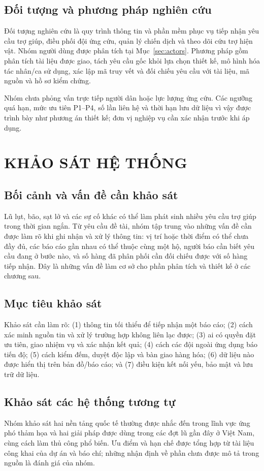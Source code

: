 \documentclass[12pt,a4paper,oneside]{report}
\begin{document}
\section{Đối tượng và phương pháp nghiên cứu}
Đối tượng nghiên cứu là quy trình thông tin và phần mềm phục vụ tiếp nhận yêu cầu trợ giúp, điều phối đội ứng cứu, quản lý chiến dịch và theo dõi cứu trợ hiện vật. Nhóm người dùng được phân tích tại Mục~\ref{sec:actors}. Phương pháp gồm phân tích tài liệu được giao, tách yêu cầu gốc khỏi lựa chọn thiết kế, mô hình hóa tác nhân/ca sử dụng, xác lập mã truy vết và đối chiếu yêu cầu với tài liệu, mã nguồn và hồ sơ kiểm chứng.

Nhóm chưa phỏng vấn trực tiếp người dân hoặc lực lượng ứng cứu. Các ngưỡng quá hạn, mức ưu tiên P1–P4, số lần liên hệ và thời hạn lưu dữ liệu vì vậy được trình bày như phương án thiết kế; đơn vị nghiệp vụ cần xác nhận trước khi áp dụng.

\chapter{KHẢO SÁT HỆ THỐNG}\label{ch:survey}
\section{Bối cảnh và vấn đề cần khảo sát}
Lũ lụt, bão, sạt lở và các sự cố khác có thể làm phát sinh nhiều yêu cầu trợ giúp trong thời gian ngắn. Từ yêu cầu đề tài, nhóm tập trung vào những vấn đề cần được làm rõ khi ghi nhận và xử lý thông tin: vị trí hoặc thời điểm có thể chưa đầy đủ, các báo cáo gần nhau có thể thuộc cùng một hộ, người báo cần biết yêu cầu đang ở bước nào, và số hàng đã phân phối cần đối chiếu được với số hàng tiếp nhận. Đây là những vấn đề làm cơ sở cho phần phân tích và thiết kế ở các chương sau.

\section{Mục tiêu khảo sát}
Khảo sát cần làm rõ: (1) thông tin tối thiểu để tiếp nhận một báo cáo; (2) cách xác minh nguồn tin và xử lý trường hợp không liên lạc được; (3) ai có quyền đặt ưu tiên, giao nhiệm vụ và xác nhận kết quả; (4) cách các đội ngoài ứng dụng báo tiến độ; (5) cách kiểm đếm, duyệt độc lập và bàn giao hàng hóa; (6) dữ liệu nào được hiển thị trên bản đồ/báo cáo; và (7) điều kiện kết nối yếu, bảo mật và lưu trữ dữ liệu.


\section{Khảo sát các hệ thống tương tự}\label{sec:similar-systems}
Nhóm khảo sát hai nền tảng quốc tế thường được nhắc đến trong lĩnh vực ứng phó thảm họa và hai giải pháp được dùng trong các đợt lũ gần đây ở Việt Nam, cùng cách làm thủ công phổ biến. Ưu điểm và hạn chế được tổng hợp từ tài liệu công khai của dự án và báo chí; những nhận định về phần chưa được mô tả trong nguồn là đánh giá của nhóm.
\end{document}
